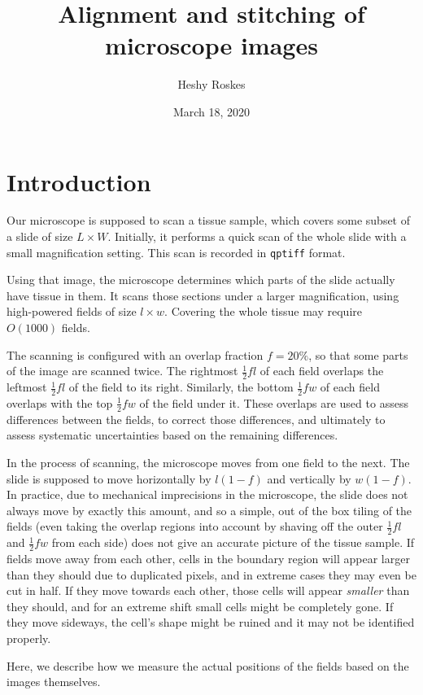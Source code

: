 \documentclass{article}
\begin{document}
	
\title{Alignment and stitching of microscope images}
\author{Heshy Roskes}
\date{March 18, 2020}

\section{Introduction}

Our microscope is supposed to scan a tissue sample, which covers some subset of a slide of size $L\times W$.  Initially, it performs a quick scan of the whole slide with a small magnification setting.  This scan is recorded in \texttt{qptiff} format.

Using that image, the microscope determines which parts of the slide actually have tissue in them.  It scans those sections under a larger magnification, using high-powered fields of size $l\times w$.  Covering the whole tissue may require $O(1000)$ fields.

The scanning is configured with an overlap fraction $f=20\%$, so that some parts of the image are scanned twice.  The rightmost $\frac{1}{2}fl$ of each field overlaps the leftmost $\frac{1}{2}fl$ of the field to its right.  Similarly, the bottom $\frac{1}{2}fw$ of each field overlaps with the top $\frac{1}{2}fw$ of the field under it.  These overlaps are used to assess differences between the fields, to correct those differences, and ultimately to assess systematic uncertainties based on the remaining differences.

In the process of scanning, the microscope moves from one field to the next.   The slide is supposed to move horizontally by $l(1-f)$ and vertically by $w(1-f)$.  In practice, due to mechanical imprecisions in the microscope, the slide does not always move by exactly this amount, and so a simple, out of the box tiling of the fields (even taking the overlap regions into account by shaving off the outer $\frac{1}{2}fl$ and $\frac{1}{2}fw$ from each side) does not give an accurate picture of the tissue sample.  If fields move away from each other, cells in the boundary region will appear larger than they should due to duplicated pixels, and in extreme cases they may even be cut in half.  If they move towards each other, those cells will appear \emph{smaller} than they should, and for an extreme shift small cells might be completely gone.  If they move sideways, the cell's shape might be ruined and it may not be identified properly.

Here, we describe how we measure the actual positions of the fields based on the images themselves.
\end{document}
